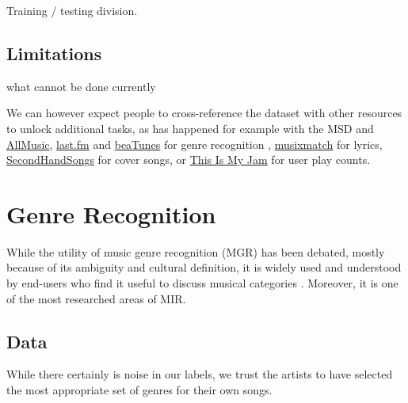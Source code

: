 \documentclass{article}
\newcommand{\todo}[1]{{\color{red} #1 }}
\begin{document}
Training / testing division.

\subsection{Limitations}

\todo{what cannot be done currently}


We can however expect people to cross-reference the dataset with other resources to unlock additional tasks, as has happened for example with the MSD and \href{http://www.allmusic.com}{AllMusic}, \href{https://www.last.fm}{last.fm} and \href{https://beatunes.com}{beaTunes} for genre recognition \cite{msd_features, msd_genres}, \href{https://musixmatch.com}{musixmatch} for lyrics, \href{https://secondhandsongs.com}{SecondHandSongs} for cover songs, or \href{https://www.thisismyjam.com}{This Is My Jam} for user play counts.


\section{Genre Recognition} %


While the utility of music genre recognition (MGR) has been debated, mostly because of its ambiguity and cultural definition, it is widely used and understood by end-users who find it useful to discuss musical categories \cite{mgr_why}. Moreover, it is one of the most researched areas of MIR.

\subsection{Data}

While there certainly is noise in our labels, we trust the artists to have selected the most appropriate set of genres for their own songs.
\end{document}
